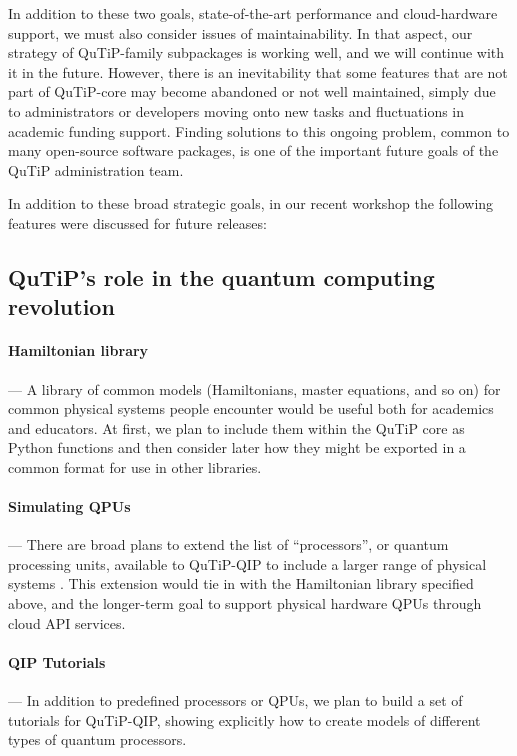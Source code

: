 \documentclass[preprint,3p,sort&compress]{elsarticle}
\begin{document}
In addition to these two goals, state-of-the-art performance and cloud-hardware support, we must also consider issues of maintainability. In that aspect, our strategy of QuTiP-family subpackages is working well, and we will continue with it in the future. However, there is an inevitability that some features that are not part of QuTiP-core may become abandoned or not well maintained, simply due to administrators or developers moving onto new tasks and fluctuations in academic funding support.  Finding solutions to this ongoing problem, common to many open-source software packages, is one of the important future goals of the QuTiP administration team.


In addition to these broad strategic goals, in our recent workshop the following features were discussed for future releases:

\subsection{QuTiP's role in the quantum computing revolution}
\paragraph{Hamiltonian library} --- A library of common models (Hamiltonians, master equations, and so on) for common physical systems people encounter would be useful both for academics and educators. At first, we plan to include them within the QuTiP core as Python functions and then consider later how they might be exported in a common format for use in other libraries.

\paragraph{Simulating QPUs} --- There are broad plans to extend the list of ``processors'', or quantum processing units, available to QuTiP-QIP to include a larger range of physical systems \cite{buluta2011natural,Gu2017,Kockum2019,Cheng2023}.  This extension would tie in with the Hamiltonian library specified above, and the longer-term goal to support physical hardware QPUs through cloud API services.

\paragraph{QIP Tutorials} --- In addition to predefined processors or QPUs, we plan to build a set of tutorials for QuTiP-QIP, showing explicitly how to create models of different types of quantum processors. 
\end{document}
